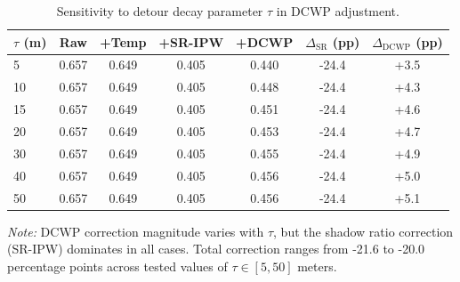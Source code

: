 \begin{table}[t!]
\centering
\caption{Sensitivity to detour decay parameter $\tau$ in DCWP adjustment.}
\label{tab:sensitivity-tau}
\small
\begin{tabular}{@{}lcccccc@{}}
\toprule
$\tau$ (m) & Raw & +Temp & +SR-IPW & +DCWP & $\Delta_{\text{SR}}$ (pp) & $\Delta_{\text{DCWP}}$ (pp) \\
\midrule
 5 & 0.657 & 0.649 & 0.405 & 0.440 & -24.4 & +3.5 \\
10 & 0.657 & 0.649 & 0.405 & 0.448 & -24.4 & +4.3 \\
15 & 0.657 & 0.649 & 0.405 & 0.451 & -24.4 & +4.6 \\
20 & 0.657 & 0.649 & 0.405 & 0.453 & -24.4 & +4.7 \\
30 & 0.657 & 0.649 & 0.405 & 0.455 & -24.4 & +4.9 \\
40 & 0.657 & 0.649 & 0.405 & 0.456 & -24.4 & +5.0 \\
50 & 0.657 & 0.649 & 0.405 & 0.456 & -24.4 & +5.1 \\
\bottomrule
\end{tabular}
\vspace{2pt}
\parbox{0.9\linewidth}{\footnotesize
\textit{Note:} DCWP correction magnitude varies with $\tau$, but the shadow ratio correction (SR-IPW) dominates in all cases. Total correction ranges from -21.6 to -20.0 percentage points across tested values of $\tau \in [5, 50]$ meters.
}
\end{table}
